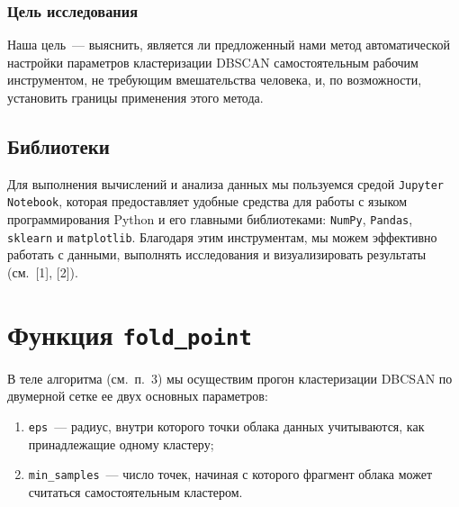 \documentclass[a4paper,12pt]{article}
\begin{document}
\subsubsection{Цель исследования} 

Наша цель — выяснить, является ли предложенный нами метод автоматической настройки параметров кластеризации DBSCAN самостоятельным рабочим инструментом, не требующим вмешательства человека, и, по возможности, установить границы применения этого метода.

\subsection{Библиотеки}
Для выполнения вычислений и анализа данных мы пользуемся средой \texttt{Jupyter Notebook}, которая предоставляет удобные средства для работы с языком программирования Python и его главными библиотеками: \texttt{NumPy}, \texttt{Pandas}, \texttt{sklearn} и \texttt{matplotlib}. Благодаря этим инструментам, мы можем эффективно работать с данными, выполнять исследования и визуализировать результаты (см. [1], [2]). 

%


\section{Функция \textbf{\texttt{fold\_point}}}

В теле алгоритма (см. п. 3) мы осуществим прогон кластеризации DBCSAN по двумерной сетке ее двух основных параметров:

\medskip\noindent 
\begin{enumerate}
	\item \texttt{eps} — радиус, внутри которого точки облака данных учитываются, как принадлежащие одному кластеру;
	\item \texttt{min\_samples} — число точек, начиная с которого фрагмент облака может считаться самостоятельным кластером.
\end{enumerate}
\end{document}
